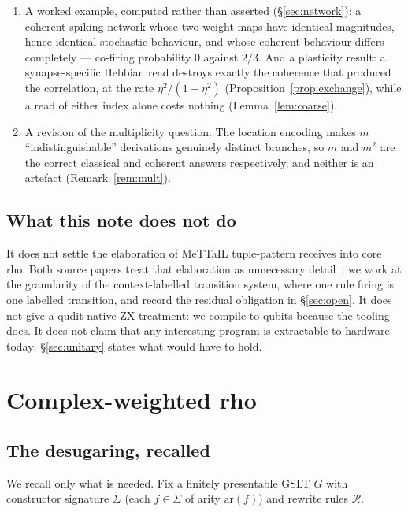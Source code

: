 \documentclass[11pt]{article}
\theoremstyle{definition}
\theoremstyle{plain}
\newcommand{\Tags}{\Sigma}
\begin{document}
\begin{enumerate}[leftmargin=*]
        (\S\ref{sec:unitary}, Theorem~\ref{thm:dilation}).
  \item A worked example, computed rather than asserted (\S\ref{sec:network}):
        a coherent spiking network whose two weight maps have identical
        magnitudes, hence identical stochastic behaviour, and whose coherent
        behaviour differs completely --- co-firing probability $0$ against
        $2/3$. And a plasticity result: a synapse-specific Hebbian read
        destroys exactly the coherence that produced the correlation, at the
        rate $\eta^2/(1+\eta^2)$ (Proposition~\ref{prop:exchange}), while a
        read of either index alone costs nothing (Lemma~\ref{lem:coarse}).
  \item A revision of the multiplicity question. The location encoding makes $m$ ``indistinguishable''
        derivations genuinely distinct branches, so $m$ and $m^2$ are the correct classical and
        coherent answers respectively, and neither is an artefact (Remark~\ref{rem:mult}).
\end{enumerate}

\subsection{What this note does not do}

It does not settle the elaboration of MeTTaIL tuple-pattern receives into core rho. Both source
papers treat that elaboration as unnecessary detail~\cite[\S2.2]{optimal}; we work at the
granularity of the context-labelled transition system, where one rule firing is one labelled
transition, and record the residual obligation in \S\ref{sec:open}. It does not give a
qudit-native ZX treatment: we compile to qubits because the tooling does. It does not claim
that any interesting program is extractable to hardware today; \S\ref{sec:unitary} states what
would have to hold.

\section{Complex-weighted rho}\label{sec:cwrho}

\subsection{The desugaring, recalled}

We recall only what is needed. Fix a finitely presentable GSLT $G$ with constructor signature
$\Tags$ (each $f \in \Tags$ of arity $\mathrm{ar}(f)$) and rewrite rules $\mathcal{R}$.
\end{document}
